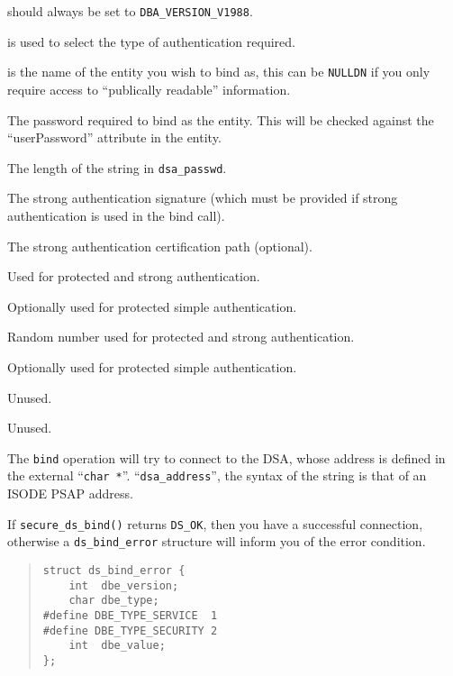 \begin{describe}
\item [\verb"dba\_version":] should always be set to
\verb"DBA_VERSION_V1988".
\item [\verb"dsa\_auth\_type":] is used to select the type of authentication
required.
\item [\verb"dba\_dn":] is the name of the entity you wish to bind as, this
can be \verb"NULLDN" if you only require access to ``publically readable''
information.
\item [\verb"dba\_passwd":] The password required to bind as the entity.
This will be checked against the ``userPassword'' attribute in the entity.
\item [\verb"dba\_passwd\_len":] The length of the string in
\verb"dsa_passwd".
\item [\verb"dba\_sig":] The strong authentication signature (which must be
provided if strong authentication is used in the bind call).
\item [\verb"dba\_cpath":] The strong authentication certification path
(optional).
\item [\verb"dba\_time1":] Used for protected and strong authentication.
\item [\verb"dba\_time2":] Optionally used for protected simple authentication.
\item [\verb"dba\_r1":] Random number used for protected and strong
authentication.
\item [\verb"dba\_r2":] Optionally used for protected simple
authentication.
\item [\verb"dba\_vtmp":] Unused.
\item [\verb"dba\_vlen":] Unused.
\end{describe}

The \verb"bind" operation will try to connect to the DSA, whose address is
defined in the external ``\verb"char *"''. ``\verb"dsa_address"'', the
syntax of the string is that of an ISODE PSAP address.

If \verb"secure_ds_bind()" returns \verb"DS_OK", then you have a successful connection,
otherwise a \verb"ds_bind_error" structure will inform you 
of the error condition.

\begin{quote}\small\begin{verbatim}
struct ds_bind_error {
    int  dbe_version;
    char dbe_type;
#define DBE_TYPE_SERVICE  1
#define DBE_TYPE_SECURITY 2
    int  dbe_value;        
};
\end{verbatim}\end{quote}

